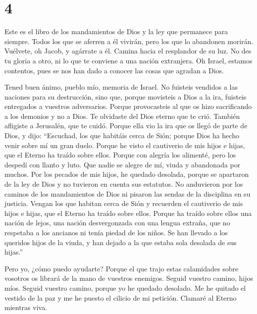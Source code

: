 \hypertarget{section-3}{%
\section{4}\label{section-3}}

 Este es el libro de los mandamientos de Dios y la ley que
permanece para siempre. Todos los que se aferren a él vivirán, pero los
que lo abandonen morirán.  Vuélvete, oh Jacob, y agárrate
a él. Camina hacia el resplandor de su luz.  No des tu
gloria a otro, ni lo que te conviene a una nación extranjera.
 Oh Israel, estamos contentos, pues se nos han dado a
conocer las cosas que agradan a Dios.

 Tened buen ánimo, pueblo mío, memoria de Israel.
 No fuisteis vendidos a las naciones para su destrucción,
sino que, porque movisteis a Dios a la ira, fuisteis entregados a
vuestros adversarios.  Porque provocasteis al que os hizo
sacrificando a los demonios y no a Dios.  Te olvidaste del
Dios eterno que te crió. También afligiste a Jerusalén, que te cuidó.
 Porque ella vio la ira que os llegó de parte de Dios, y
dijo: ``Escuchad, los que habitáis cerca de Sión; porque Dios ha hecho
venir sobre mí un gran duelo.  Porque he visto el
cautiverio de mis hijos e hijas, que el Eterno ha traído sobre ellos.
 Porque con alegría los alimenté, pero los despedí con
llanto y luto.  Que nadie se alegre de mí, viuda y
abandonada por muchos. Por los pecados de mis hijos, he quedado
desolada, porque se apartaron de la ley de Dios  y no
tuvieron en cuenta sus estatutos. No anduvieron por los caminos de los
mandamientos de Dios ni pisaron las sendas de la disciplina en su
justicia.  Vengan los que habitan cerca de Sión y
recuerden el cautiverio de mis hijos e hijas, que el Eterno ha traído
sobre ellos.  Porque ha traído sobre ellos una nación de
lejos, una nación desvergonzada con una lengua extraña, que no respetaba
a los ancianos ni tenía piedad de los niños.  Se han
llevado a los queridos hijos de la viuda, y han dejado a la que estaba
sola desolada de sus hijas.''

 Pero yo, ¿cómo puedo ayudarte?  Porque el
que trajo estas calamidades sobre vosotros os librará de la mano de
vuestros enemigos.  Seguid vuestro camino, hijos míos.
Seguid vuestro camino, porque yo he quedado desolado.  Me
he quitado el vestido de la paz y me he puesto el cilicio de mi
petición. Clamaré al Eterno mientras viva.

